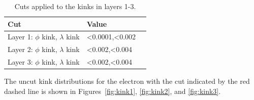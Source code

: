 \begin{table}[H]
\caption{Cuts applied to the kinks in layers 1-3.}
\label{kink_cuts}
\centering
\begin{tabular}{lll}
\toprule
Cut & Value \\
\midrule
Layer 1: $\phi$ kink, $\lambda$ kink & <0.0001,<0.002\\
Layer 2: $\phi$ kink, $\lambda$ kink & <0.002,<0.004\\
Layer 3: $\phi$ kink, $\lambda$ kink & <0.002,<0.004\\
\bottomrule
\end{tabular}
\end{table}

The uncut kink distributions for the electron with the cut indicated by the red dashed line is shown in Figures~\ref{fig:kink1}, \ref{fig:kink2}, and \ref{fig:kink3}.

